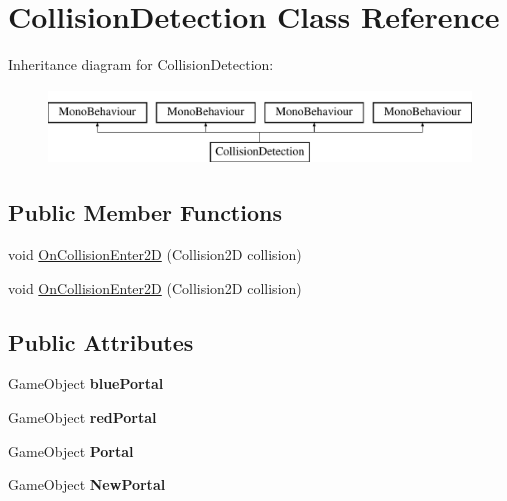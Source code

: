 \hypertarget{class_collision_detection}{}\section{Collision\+Detection Class Reference}
\label{class_collision_detection}
Inheritance diagram for Collision\+Detection\+:\begin{figure}[H]
\begin{center}
\leavevmode
\includegraphics[height=2.000000cm]{class_collision_detection}
\end{center}
\end{figure}
\subsection*{Public Member Functions}
\begin{DoxyCompactItemize}
\item 
void \mbox{\hyperlink{class_collision_detection_ae5c7d4d990b3c888dc8866821a3d0366}{On\+Collision\+Enter2D}} (Collision2D collision)
\item 
void \mbox{\hyperlink{class_collision_detection_ae5c7d4d990b3c888dc8866821a3d0366}{On\+Collision\+Enter2D}} (Collision2D collision)
\end{DoxyCompactItemize}
\subsection*{Public Attributes}
\begin{DoxyCompactItemize}
\item 
\mbox{\label{class_collision_detection_a5998d298c2f3c52ca58af7e2604a8559}} 
Game\+Object {\bfseries blue\+Portal}
\item 
\mbox{\label{class_collision_detection_acb663162929e709c69b80cf62f864d6a}} 
Game\+Object {\bfseries red\+Portal}
\item 
\mbox{\label{class_collision_detection_a4bd58b38fd8034d725f0262c78addfeb}} 
Game\+Object {\bfseries Portal}
\item 
\mbox{\label{class_collision_detection_a4281fd2d4607ab7b94d947928dc388a9}} 
Game\+Object {\bfseries New\+Portal}
\end{DoxyCompactItemize}


